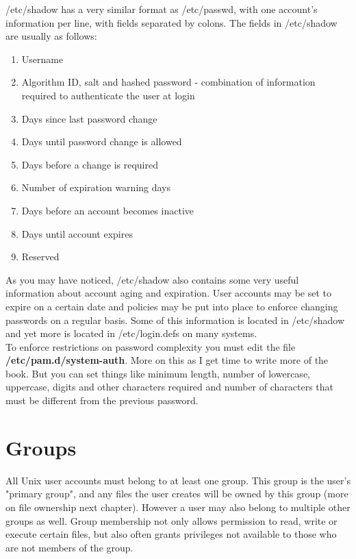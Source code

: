 /etc/shadow has a very similar format as /etc/passwd, with one account's information per line, with fields separated by colons.  The fields in /etc/shadow are usually as follows:

\begin{enumerate}
\item Username
\item Algorithm ID, salt and hashed password - combination of information required to authenticate the user at login
\item Days since last password change
\item Days until password change is allowed
\item Days before a change is required
\item Number of expiration warning days
\item Days before an account becomes inactive
\item Days until account expires
\item Reserved
\end{enumerate}

As you may have noticed, /etc/shadow also contains some very useful information about account aging and expiration.  User accounts may be set to expire on a certain date and policies may be put into place to enforce changing passwords on a regular basis.  Some of this information is located in /etc/shadow and yet more is located in /etc/login.defs on many systems.\\

To enforce restrictions on password complexity you must edit the file \textbf{/etc/pam.d/system-auth}.  More on this as I get time to write more of the book.  But you can set things like minimum length, number of lowercase, uppercase, digits and other characters required and number of characters that must be different from the previous password.


\section{Groups}

All Unix user accounts must belong to at least one group.  This group is the user's "primary group", and any files the user creates will be owned by this group (more on file ownership next chapter).  However a user may also belong to multiple other groups as well.  Group membership not only allows permission to read, write or execute certain files, but also often grants privileges not available to those who are not members of the group.\\

